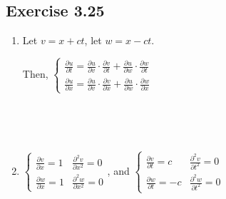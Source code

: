 {~~~}

\subsection*{Exercise 3.25}

\begin{enumerate}
    \item Let $v = x + ct$, let $w = x - ct$. 
    
    Then, $\begin{cases}
            \frac{\partial u}{\partial t} = \frac{\partial u}{\partial v} \cdot \frac{\partial v}{\partial t} + \frac{\partial u}{\partial w} \cdot \frac{\partial w}{\partial t} \\
            \frac{\partial u}{\partial x} = \frac{\partial u}{\partial v} \cdot \frac{\partial v}{\partial x} + \frac{\partial u}{\partial w} \cdot \frac{\partial w}{\partial x}
    \end{cases}$

    {~~~}
    
    {~~~}

    \item $\begin{cases}
        \frac{\partial v}{\partial x} = 1  & \frac{\partial^2 v}{\partial x^2} = 0 \\
        \frac{\partial w}{\partial x} = 1  & \frac{\partial^2 w}{\partial x^2} = 0
    \end{cases}$, and $\begin{cases}
        \frac{\partial v}{\partial t} = c  & \frac{\partial^2 v}{\partial t^2} = 0 \\
        \frac{\partial w}{\partial t} = -c & \frac{\partial^2 w}{\partial t^2} = 0 
    \end{cases}$
    
    {~~~}

    {~~~}
    

\end{enumerate}
